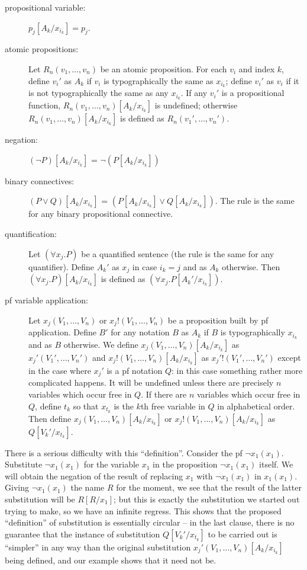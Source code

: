 \documentclass{article}
\begin{document}
\begin{description}

\item[propositional variable:]  $p_j[A_k/x_{i_k}] = p_j$.

\item[atomic propositions:] Let $R_n(v_1,\ldots,v_n)$ be an atomic
proposition.  For each $v_i$ and index $k$, define $v_i'$ as $A_k$ if
$v_i$ is typographically the same as $x_{i_k}$; define $v_i'$ as $v_i$
if it is not typographically the same as any $x_{i_k}$.
If any $v_i'$ is a propositional function,
$R_n(v_1,\ldots,v_n)[A_k/x_{i_k}]$ is undefined; otherwise
$R_n(v_1,\ldots,v_n)[A_k/x_{i_k}]$ is defined as
$R_n(v_1',\ldots,v_n')$.

\item[negation:]  $(\neg P)[A_k/x_{i_k}]$ = $\neg(P[A_k/x_{i_k}])$

\item[binary connectives:] $(P \vee Q)[A_k/x_{i_k}]$ =
$(P[A_k/x_{i_k}] \vee Q[A_k/x_{i_k}])$.  The rule is the same for any
binary propositional connective.

\item[quantification:]  Let $(\forall x_j.P)$ be a quantified sentence
(the rule is the same for any quantifier).  Define $A_k'$ as $x_j$
in case $i_k = j$ and as $A_k$ otherwise.  Then $(\forall x_j.P)[A_k/x_{i_k}]$
is defined as $(\forall x_j.P[A_k'/x_{i_k}])$.

\item[pf variable application:] Let
$x_j(V_1,\ldots,V_n)$ or $x_j!(V_1,\ldots,V_n)$ be a
proposition built by pf application.  Define $B'$ for any notation $B$ as
$A_k$ if $B$ is typographically $x_{i_k}$ and as $B$ otherwise.  We
define $x_j(V_1,\ldots,V_n)[A_k/x_{i_k}]$ as $x_j'(V_1',\ldots,V_n')$
and $x_j!(V_1,\ldots,V_n)[A_k/x_{i_k}]$ as $x_j'!(V_1',\ldots,V_n')$
except in the case where $x_j'$ is a pf notation $Q$: in this case
something rather more complicated happens.  It will be undefined
unless there are precisely $n$ variables which occur free in $Q$.  If
there are $n$ variables which occur free in $Q$, define $t_k$ so that
$x_{t_k}$ is the $k$th free variable in $Q$ in alphabetical order.
Then define $x_j(V_1,\ldots,V_n)[A_k/x_{i_k}]$ or
$x_j!(V_1,\ldots,V_n)[A_k/x_{i_k}]$ as $Q[V_k'/x_{t_k}]$.


\end{description}

There is a serious difficulty with this ``definition''.  Consider the
pf $\neg x_1(x_1)$.  Substitute $\neg x_1(x_1)$ for the variable $x_1$
in the proposition $\neg x_1(x_1)$ itself.  We will obtain the
negation of the result of replacing $x_1$ with $\neg x_1(x_1)$ in
$x_1(x_1)$.  Giving $\neg x_1(x_1)$ the name $R$ for the moment, we
see that the result of the latter substitution will be $R[R/x_1]$; but
this is exactly the substitution we started out trying to make, so we
have an infinite regress.  This shows that the proposed ``definition''
of substitution is essentially circular -- in the last clause, there
is no guarantee that the instance of substitution $Q[V_k'/x_{t_k}]$ to
be carried out is ``simpler'' in any way than the original
substitution $x_j'(V_1,\ldots,V_n)[A_k/x_{i_k}]$ being defined, and
our example shows that it need not be.
\end{document}
